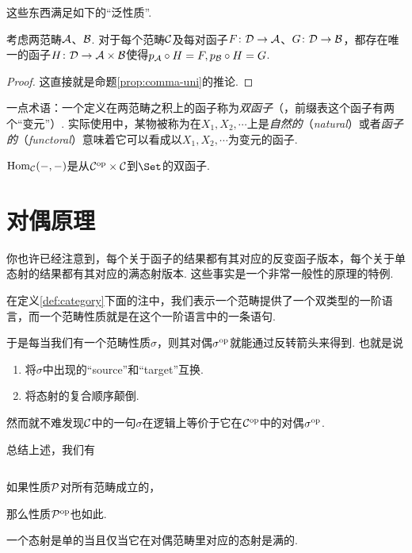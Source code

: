   这些东西满足如下的``泛性质''.
  \begin{prop}
    考虑两范畴${\cal A}$、${\cal B}$. 对于每个范畴${\cal C}$及每对函子$F\colon{\cal D}\to{\cal A}$、$G\colon{\cal D}\to{\cal B}$，都存在唯一的函子$H\colon{\cal D}\to{\cal A}\times{\cal B}$使得$p_{{\cal A}}\circ H=F, p_{{\cal B}}\circ H=G$.
  \end{prop}
  \begin{proof}
    这直接就是命题\ref{prop:comma-uni}的推论.
  \end{proof}
  一点术语：一个定义在两范畴之积上的函子称为\emph{双函子}（，前缀表这个函子有两个``变元''）.
  实际使用中，某物被称为在$X_1,X_2,\cdots$上是\emph{自然的}（\emph{natural}）或者\emph{函子的}（\emph{functoral}）意味着它可以看成以$X_1,X_2,\cdots$为变元的函子.
  \begin{exam}
    $\operatorname{Hom}_{{\cal C}}(-,-)$是从${\cal C}^{\operatorname{op}}\times{\cal C}$到$\Set$的双函子.
  \end{exam}

\section{对偶原理}
  你也许已经注意到，每个关于函子的结果都有其对应的反变函子版本，每个关于单态射的结果都有其对应的满态射版本.
  这些事实是一个非常一般性的原理的特例.

  在定义\ref{def:category}下面的注中，我们表示一个范畴提供了一个双类型的一阶语言，而一个范畴性质就是在这个一阶语言中的一条语句.

  于是每当我们有一个范畴性质$\sigma$，则其对偶$\sigma^{\operatorname{op}}$就能通过反转箭头来得到. 也就是说
  \begin{enumerate}
    \item   将$\sigma$中出现的``source''和``target''互换.
    \item   将态射的复合顺序颠倒.
  \end{enumerate}

  然而就不难发现${\cal C}$中的一句$\sigma$在逻辑上等价于它在${\cal C}^{\operatorname{op}}$中的对偶$\sigma^{\operatorname{op}}$.

  总结上述，我们有
  \begin{thm}[范畴的对偶原理]
  $ $
  \begin{center}
    如果性质${\cal P}$对所有范畴成立的，

    那么性质${\cal P}^{\operatorname{op}}$也如此.
  \end{center}
  \end{thm}

  \begin{exam}
    一个态射是单的当且仅当它在对偶范畴里对应的态射是满的.
  \end{exam}


